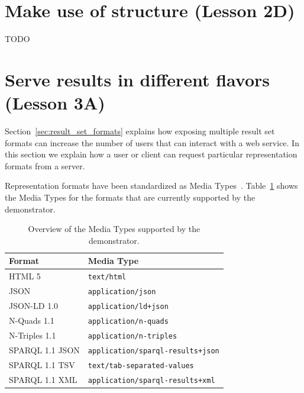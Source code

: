\documentclass[a4paper]{scrartcl}
\newcommand{\textt}[1]{{\small \texttt{#1}}}
\begin{document}
\section{Make use of structure (Lesson 2D)}

TODO



\section{Serve results in different flavors (Lesson 3A)}

Section~\ref{sec:result_set_formats} explains how exposing multiple
result set formats can increase the number of users that can interact
with a web service.  In this section we explain how a user or client
can request particular representation formats from a server.

Representation formats have been standardized as Media
Types~\cite{RFC6838}.  Table~\ref{tab:media_type} shows the Media
Types for the formats that are currently supported by the
demonstrator.

\begin{table}
  \begin{tabular}{|l|l|}
    \hline
    \textbf{Format} & \textbf{Media Type} \\
    \hline
    \hline
    HTML 5          & \textt{text/html} \\
    \hline
    JSON            & \textt{application/json} \\
    \hline
    JSON-LD 1.0     & \textt{application/ld+json} \\
    \hline
    N-Quads 1.1     & \textt{application/n-quads} \\
    \hline
    N-Triples 1.1   & \textt{application/n-triples} \\
    \hline
    SPARQL 1.1 JSON & \textt{application/sparql-results+json} \\
    \hline
    SPARQL 1.1 TSV  & \textt{text/tab-separated-values} \\
    \hline
    SPARQL 1.1 XML  & \textt{application/sparql-results+xml} \\
    \hline
  \end{tabular}
  \caption{Overview of the Media Types supported by the demonstrator.}
  \label{tab:media_type}
\end{table}
\end{document}

